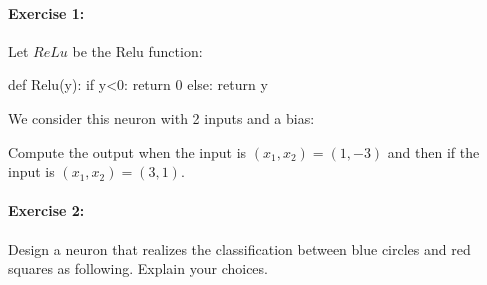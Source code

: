 \documentclass[fleqn,a4paper,11pt]{article}
\title{}
\author{}
\begin{document}

%		
%						
%						
%						
%		
	\vspace{1cm}
	
\paragraph{Exercise 1: }

Let $ReLu$ be the Relu function: 

\begin{python}
def Relu(y):
  if y<0:
	return 0
  else:
	return y
\end{python}

We consider this neuron with 2 inputs and a bias:
\begin{center}
\end{center}
Compute the output when the input is $(x_1,x_2) = (1,-3)$ and then if the input is $(x_1,x_2) = (3,1)$. 



\vspace{2em} %
\paragraph{Exercise 2: } Design a neuron that realizes the classification between blue circles and red squares as following. Explain your choices.
\end{document}
